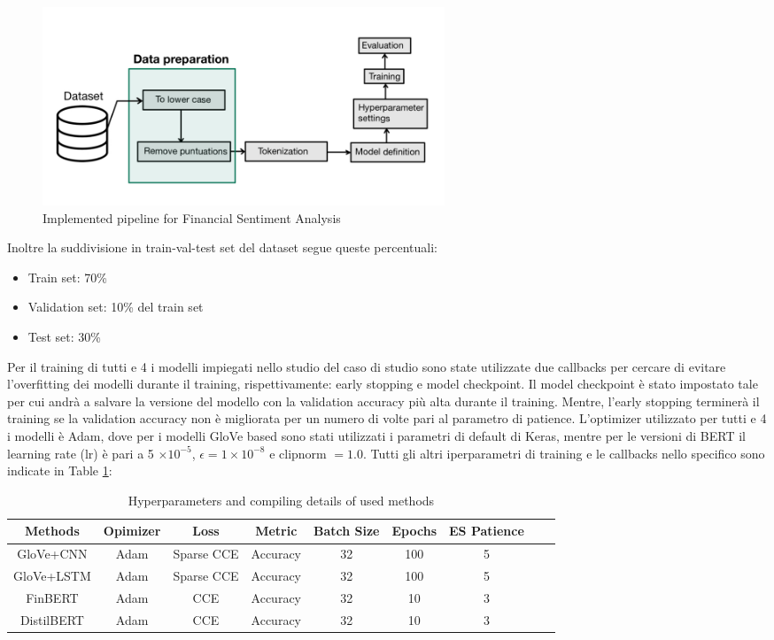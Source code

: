 \begin{figure}[!ht]
    \centering
    \includegraphics[width=12cm]{./images/pipeline.png}
    \caption{Implemented pipeline for Financial Sentiment Analysis}
    \label{fig:pipeline}
\end{figure}

Inoltre la suddivisione in train-val-test set del dataset segue queste percentuali:
\begin{itemize}
    \item Train set: 70\%
    \item Validation set: 10\% del train set
    \item Test set: 30\%
\end{itemize}
Per il training di tutti e 4 i modelli impiegati nello studio del caso di studio sono state utilizzate due callbacks per cercare di evitare l'overfitting dei modelli durante il training, rispettivamente: early stopping e model checkpoint. Il model checkpoint  è stato impostato tale per cui andrà a salvare la versione del modello con la validation accuracy più alta durante il training. Mentre, l'early stopping terminerà il training se la validation accuracy non è migliorata per un numero di volte pari al parametro di patience.
L'optimizer utilizzato per tutti e 4 i modelli è Adam, dove per i modelli GloVe based sono stati utilizzati i parametri di default di Keras, mentre per le versioni di BERT il learning rate (lr) è pari a 5 $\times 10^{-5}$, $\epsilon = 1 \times 10^{-8}$ e clipnorm $= 1.0$.
Tutti gli altri iperparametri di training e le callbacks nello specifico sono indicate in Table \ref{tab:hyper-parameter}:

\begin{table}[!ht]
  \centering
  \caption{Hyperparameters and compiling details of used methods}
  \label{tab:hyper-parameter}
  \begin{tabular}{c|c|c|c|c|c|c|c|c}
    Methods & Opimizer & Loss & Metric & Batch Size & Epochs & ES Patience\\
    \midrule
    GloVe+CNN & Adam & Sparse CCE & Accuracy & 32 & 100 & 5 \\
    GloVe+LSTM & Adam & Sparse CCE & Accuracy & 32 & 100 & 5\\
    FinBERT & Adam & CCE & Accuracy & 32 & 10 & 3\\
    DistilBERT & Adam & CCE & Accuracy & 32 & 10 & 3\\
    \bottomrule
  \end{tabular}
\end{table}

